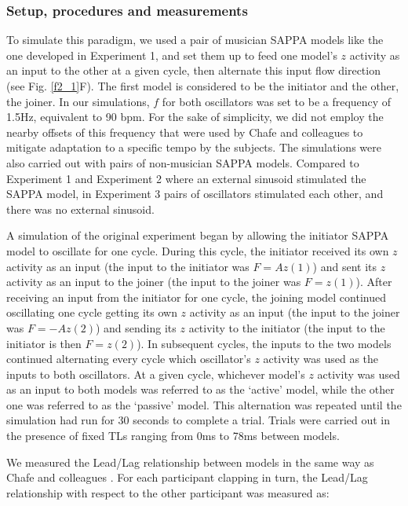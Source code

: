 \documentclass{report}
\begin{document}
\subsubsection{Setup, procedures and measurements}

To simulate this paradigm, we used a pair of musician SAPPA models like the one developed in Experiment 1, and set them up to feed one model's $z$ activity as an input to the other at a given cycle, then alternate this input flow direction (see Fig.{} \ref{f2_1}F). The first model is considered to be the initiator and the other, the joiner. In our simulations, $f$ for both oscillators was set to be a frequency of 1.5Hz, equivalent to 90 bpm. For the sake of simplicity, we did not employ the nearby offsets of this frequency that were used by Chafe and colleagues \cite{chafe2010effect} to mitigate adaptation to a specific tempo by the subjects. The simulations were also carried out with pairs of non-musician SAPPA models. Compared to Experiment 1 and Experiment 2 where an external sinusoid stimulated the SAPPA model, in Experiment 3 pairs of oscillators stimulated each other, and there was no external sinusoid.

A simulation of the original experiment began by allowing the initiator SAPPA model to oscillate for one cycle. During this cycle, the initiator received its own $z$ activity as an input (the input to the initiator was $F = Az(1)$) and sent its $z$ activity as an input to the joiner (the input to the joiner was $F = z(1)$). After receiving an input from the initiator for one cycle, the joining model continued oscillating one cycle getting its own $z$ activity as an input (the input to the joiner was $F = -Az(2)$) and sending its $z$ activity to the initiator (the input to the initiator is then $F = z(2)$). In subsequent cycles, the inputs to the two models continued alternating every cycle which oscillator's $z$ activity was used as the inputs to both oscillators. At a given cycle, whichever model's $z$ activity was used as an input to both models was referred to as the `active' model, while the other one was referred to as the `passive' model. This alternation was repeated until the simulation had run for 30 seconds to complete a trial. Trials were carried out in the presence of fixed TLs ranging from 0ms to 78ms between models.

We measured the Lead/Lag relationship between models in the same way as Chafe and colleagues \cite{chafe2010effect}. For each participant clapping in turn, the Lead/Lag relationship with respect to the other participant was measured as: 
\end{document}
